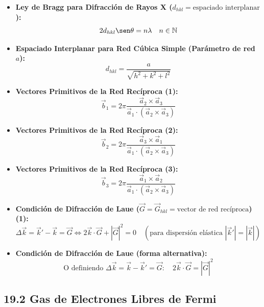 \documentclass[11pt,a4paper]{article}
\begin{document}
\begin{itemize}
  \item \textbf{Ley de Bragg para Difracción de Rayos X ($d_{hkl} = \text{espaciado interplanar}$):}
  \[
    2 d_{hkl} \sen\theta = n \lambda \quad n \in \mathbb{N}
  \]
  \item \textbf{Espaciado Interplanar para Red Cúbica Simple (Parámetro de red $a$):}
  \[
    d_{hkl} = \frac{a}{\sqrt{h^2 + k^2 + l^2}}
  \]
  \item \textbf{Vectores Primitivos de la Red Recíproca (1):}
  \[
    \vec{b}_1 = 2\pi \frac{\vec{a}_2 \times \vec{a}_3}{\vec{a}_1 \cdot (\vec{a}_2 \times \vec{a}_3)}
  \]
  \item \textbf{Vectores Primitivos de la Red Recíproca (2):}
  \[
    \vec{b}_2 = 2\pi \frac{\vec{a}_3 \times \vec{a}_1}{\vec{a}_1 \cdot (\vec{a}_2 \times \vec{a}_3)}
  \]
  \item \textbf{Vectores Primitivos de la Red Recíproca (3):}
  \[
    \vec{b}_3 = 2\pi \frac{\vec{a}_1 \times \vec{a}_2}{\vec{a}_1 \cdot (\vec{a}_2 \times \vec{a}_3)}
  \]
  \item \textbf{Condición de Difracción de Laue ($\vec{G} = \vec{G}_{hkl} = \text{vector de red recíproca}$) (1):}
  \[
    \Delta\vec{k} = \vec{k}' - \vec{k} = \vec{G} \iff 2\vec{k} \cdot \vec{G} + |\vec{G}|^2 = 0 \quad (\text{para dispersión elástica } |\vec{k}'| = |\vec{k}|)
  \]
  \item \textbf{Condición de Difracción de Laue (forma alternativa):}
  \[
    \text{O definiendo } \Delta\vec{k} = \vec{k} - \vec{k}' = \vec{G}: \quad 2\vec{k} \cdot \vec{G} = |\vec{G}|^2
  \]
\end{itemize}

\subsection*{19.2 Gas de Electrones Libres de Fermi}
\end{document}
